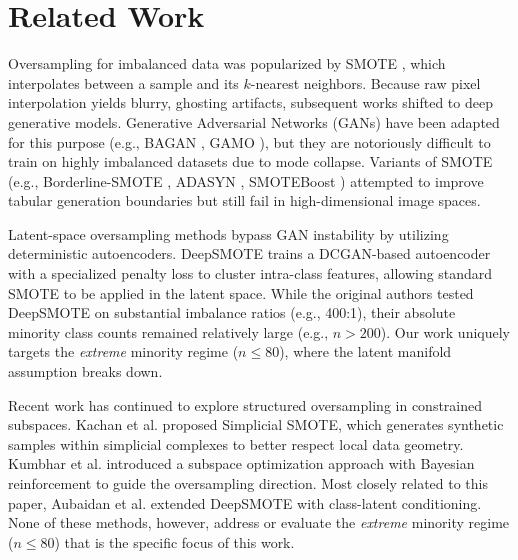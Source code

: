 \documentclass[conference]{IEEEtran}
\begin{document}
\section{Related Work}
\label{sec:related}
Oversampling for imbalanced data was popularized by SMOTE \cite{chawla2002smote}, which interpolates between a sample and its $k$-nearest neighbors. Because raw pixel interpolation yields blurry, ghosting artifacts, subsequent works shifted to deep generative models. Generative Adversarial Networks (GANs) have been adapted for this purpose (e.g., BAGAN \cite{mariani2018bagan}, GAMO \cite{mullick2019gamo}), but they are notoriously difficult to train on highly imbalanced datasets due to mode collapse. Variants of SMOTE (e.g., Borderline-SMOTE \cite{han2005borderline}, ADASYN \cite{he2008adasyn}, SMOTEBoost \cite{chawla2003smoteboost}) attempted to improve tabular generation boundaries but still fail in high-dimensional image spaces.

Latent-space oversampling methods bypass GAN instability by utilizing deterministic autoencoders. DeepSMOTE \cite{dablain2022deepsmote} trains a DCGAN-based autoencoder \cite{radford2015unsupervised} with a specialized penalty loss to cluster intra-class features, allowing standard SMOTE to be applied in the latent space. While the original authors tested DeepSMOTE on substantial imbalance ratios (e.g., 400:1), their absolute minority class counts remained relatively large (e.g., $n > 200$). Our work uniquely targets the \emph{extreme} minority regime ($n \le 80$), where the latent manifold assumption breaks down.

Recent work has continued to explore structured oversampling in constrained subspaces. Kachan et al. \cite{kachan2025simplicial} proposed Simplicial SMOTE, which generates synthetic samples within simplicial complexes to better respect local data geometry. Kumbhar et al. \cite{kumbhar2026imbalanced} introduced a subspace optimization approach with Bayesian reinforcement to guide the oversampling direction. Most closely related to this paper, Aubaidan et al. \cite{aubaidan2026deepclsmote} extended DeepSMOTE with class-latent conditioning. None of these methods, however, address or evaluate the \emph{extreme} minority regime ($n \le 80$) that is the specific focus of this work.

\end{document}
